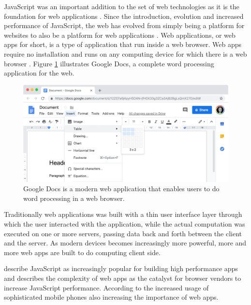 JavaScript was an important addition to the set of web technologies as it is the foundation for web applications \parencite{ParkJungMoon2015}. Since the introduction, evolution and increased performance of JavaScript, the web has evolved from simply being a platform for websites to also be a platform for web applications \parencite{SandhuHerreraHendren2018}. Web applications, or web apps for short, is a type of application that run inside a web browser. Web apps require no installation and runs on any computing device for which there is a web browser \parencite{RatanaworabhanLivshitsZorn2010}. Figure \ref{google-docs} illustrates Google Docs, a complete word processing application for the web.

\begin{figure}[!h]
\centering
\includegraphics[width=16cm,keepaspectratio]{figures/google-docs}
\caption{Google Docs is a modern web application that enables users to do word processing in a web browser.}
\label{google-docs}
\end{figure}

Traditionally web applications was built with a thin user interface layer through which the user interacted with the application, while the actual computation was executed on one or more servers, %
passing data back and forth between the client and the server. As modern devices becomes increasingly more powerful, more and more web apps are built to do computing client side.

\textcite{SandhuHerreraHendren2018} describe JavaScript as increasingly popular for building high performance apps and \textcite{RatanaworabhanLivshitsZorn2010} describes the complexity of web apps as the catalyst for browser vendors to increase JavaScript performance. According to \textcite{RatanaworabhanLivshitsZorn2010} the increased usage of sophisticated mobile phones also increasing the importance of web apps.
